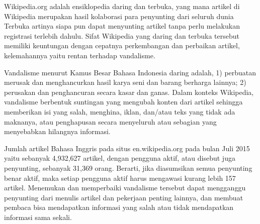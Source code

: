 Wikipedia.org adalah ensiklopedia daring dan terbuka, yang mana artikel di
Wikipedia merupakan hasil kolaborasi para penyunting dari seluruh dunia
Terbuka artinya siapa pun dapat menyunting artikel tanpa perlu melakukan
registrasi terlebih dahulu.
Sifat Wikipedia yang daring dan terbuka tersebut memiliki keuntungan dengan
cepatnya perkembangan dan perbaikan artikel, kelemahannya yaitu rentan terhadap
vandalisme.

Vandalisme menurut Kamus Besar Bahasa Indonesia daring adalah,
1) perbuatan merusak dan menghancurkan hasil karya seni dan barang berharga
lainnya;
2) perusakan dan penghancuran secara kasar dan ganas.
Dalam konteks Wikipedia, vandalisme berbentuk suntingan yang mengubah
konten dari artikel sehingga memberikan isi yang salah, menghina, iklan,
dan/atau teks yang tidak ada maknanya, atau penghapusan secara
menyeluruh atau sebagian yang menyebabkan hilangnya informasi.

Jumlah artikel Bahasa Inggris pada situs en.wikipedia.org pada bulan Juli 2015
yaitu sebanyak 4,932,627 artikel, dengan pengguna aktif, atau disebut juga
penyunting, sebanyak 31,369 orang.
Berarti, jika diasumsikan semua penyunting benar aktif, maka setiap pengguna
aktif harus mengawasi kurang lebih 157 artikel.
Menemukan dan memperbaiki vandalisme tersebut dapat mengganggu penyunting dari
menulis artikel dan pekerjaan penting lainnya, dan membuat pembaca bisa
mendapatkan informasi yang salah atau tidak mendapatkan informasi sama sekali.

